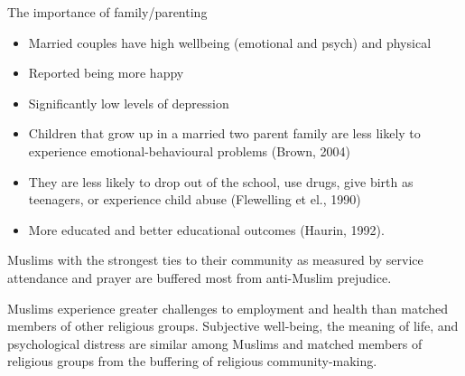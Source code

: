 \documentclass[
  ignorenonframetext,
  aspectratio=169,
]{beamer}
\providecommand{\tightlist}{%
  \setlength{\itemsep}{0pt}\setlength{\parskip}{0pt}}\usepackage{longtable,booktabs,array}
\begin{document}
\begin{frame}{The importance of family/parenting}
\label{the-importance-of-familyparenting}
\begin{itemize}[<+->]
\tightlist
\item
  Married couples have high wellbeing (emotional and psych) and physical
\item
  Reported being more happy
\item
  Significantly low levels of depression
\item
  Children that grow up in a married two parent family are less likely
  to experience emotional-behavioural problems (Brown, 2004)
\item
  They are less likely to drop out of the school, use drugs, give birth
  as teenagers, or experience child abuse (Flewelling et el., 1990)
\item
  More educated and better educational outcomes (Haurin, 1992).
\end{itemize}
\end{frame}

\begin{frame}{Muslims with the strongest ties to their community as
measured by service attendance and prayer are buffered most from
anti-Muslim prejudice.}
\label{muslims-with-the-strongest-ties-to-their-community-as-measured-by-service-attendance-and-prayer-are-buffered-most-from-anti-muslim-prejudice.}
\end{frame}

\begin{frame}{Muslims experience greater challenges to employment and
health than matched members of other religious groups.}
\label{muslims-experience-greater-challenges-to-employment-and-health-than-matched-members-of-other-religious-groups.}
Subjective well-being, the meaning of life, and psychological distress
are similar among Muslims and matched members of religious groups from
the buffering of religious community-making.
\end{frame}
\end{document}
